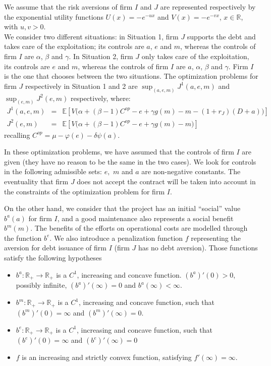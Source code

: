 \documentclass{svjour3}
\begin{document}
We assume that the risk aversions of firm $I$ and $J$ are represented respectively by the
 exponential utility functions $U(x)=-e^{-ux}$ and $V(x)=-e^{-vx}$, $x\in\mathbb{R}$, 
 with $u,v>0$.
\\
We consider two different situations: in Situation 1, firm $J$ supports the debt and
 takes care of the exploitation; its controls are $a$, $e$ and $m$, whereas the controls 
 of firm $I$ are $\alpha$, $\beta$ and $\gamma$. In Situation 2, firm $J$ only takes care 
 of the exploitation, its controls are $e$ and $m$, whereas the controls of firm $I$ are
  $a$, $\alpha$, $\beta$ and $\gamma$. Firm $I$ is the one that chooses between the two situations. The optimization problems for firm $J$ respectively in Situation 1 and 2 
  are $\sup_{(a,e,m)}J^1(a,e,m)$ and $\sup_{(e,m)}J^2(e,m)$ respectively, where:
\begin{eqnarray}
\label{defJv1}
 J^1(a,e,m)&=&\mathbb{E} \left[V\big(\alpha+(\beta-1)C^{op}-e+\gamma g(m)-m-(1+r_J)(D+a)\big)\right]
\\
 J^2(e,m)&=&\mathbb{E}\left[V\big(\alpha+(\beta-1)
C^{op}-e+\gamma g(m)-m\big)\right]
\label{defJv2}
\end{eqnarray}
recalling $C^{op}=\mu-\varphi(e)-\delta \psi(a)$.

In these optimization problems, we have assumed that the controls of firm $I$ are given (they have no reason to be the same in the two cases). We look for controls in the following admissible sets: $e,$ $m$ and $a$ are  non-negative constants. The eventuality  that firm $J$ does not accept the contract will be  taken into account  in the constraints of the optimization problem for firm $I$. 

\vspace{5mm}

\noindent On the other hand, we consider that the project has an initial ``social'' value $b^a(a)$   for firm $I$, and  a good maintenance also represents a social benefit $b^m(m)$. The benefits of the efforts on operational costs are modelled through the  function $b^e$. We also introduce a penalization function $f$ representing the aversion for debt issuance of firm $I$ (firm $J$ has no debt aversion). Those functions   satisfy the following hypotheses
\begin{itemize}
\item $b^a:\mathbb{R}_+\to\mathbb{R}_+$ is a $C^1$, increasing and concave function.  $(b^a)'(0)>0$, possibly infinite, $(b^a)'(\infty)=0$ and  $b^a(\infty)<\infty$.
\item $b^m:\mathbb{R}_+\to\mathbb{R}_+$ is  a $C^1$, increasing and concave function, such that  $(b^m)'(0)=\infty$ and $(b^m)'(\infty)=0$.
\item $b^e:\mathbb{R}_+\to\mathbb{R}_+$ is  a $C^1$, increasing and concave function,  such that $(b^e)'(0)=\infty$ and $(b^e)'(\infty)=0$
\item $f$ is an increasing and strictly convex function, satisfying  $f'(\infty)=\infty$.
\end{itemize}
\end{document}
